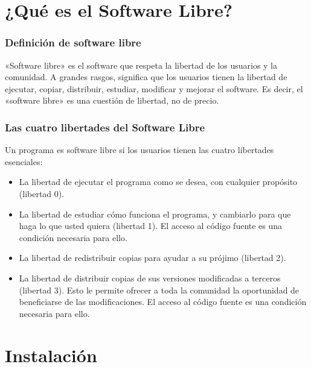 \documentclass{beamer}
\begin{document}
\section{¿Qué es el Software Libre?}
\begin{frame}
\frametitle{Definición de software libre}
«Software libre» es el software que respeta la libertad de los usuarios y la comunidad. A grandes rasgos, significa que los usuarios tienen la libertad de ejecutar, copiar, distribuir, estudiar, modificar y mejorar el software. Es decir, el «software libre» es una cuestión de libertad, no de precio.

\end{frame}
\begin{frame}
\frametitle{Las cuatro libertades del Software Libre}
Un programa es software libre si los usuarios tienen las cuatro libertades esenciales:
\begin{itemize}
\item La libertad de ejecutar el programa como se desea, con cualquier propósito (libertad 0).
\item La libertad de estudiar cómo funciona el programa, y cambiarlo para que haga lo que usted quiera (libertad 1). El acceso al código fuente es una condición necesaria para ello.
\item La libertad de redistribuir copias para ayudar a su prójimo (libertad 2).
\item La libertad de distribuir copias de sus versiones modificadas a terceros (libertad 3). Esto le permite ofrecer a toda la comunidad la oportunidad de beneficiarse de las modificaciones. El acceso al código fuente es una condición necesaria para ello.
\end{itemize}
\end{frame}

\section{Instalación} %

\end{document}
